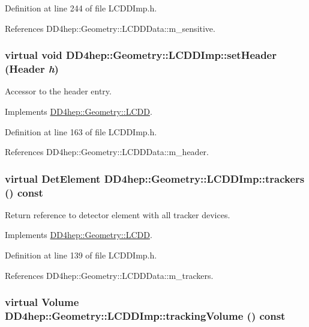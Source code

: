 Definition at line 244 of file LCDDImp.h.

References DD4hep::Geometry::LCDDData::m\_\-sensitive.\hypertarget{class_d_d4hep_1_1_geometry_1_1_l_c_d_d_imp_af37d163b4c62d1ef1602555d39e0eff8}{
\subsubsection[{setHeader}]{\setlength{\rightskip}{0pt plus 5cm}virtual void DD4hep::Geometry::LCDDImp::setHeader ({\bf Header} {\em h})}}
\label{class_d_d4hep_1_1_geometry_1_1_l_c_d_d_imp_af37d163b4c62d1ef1602555d39e0eff8}


Accessor to the header entry. 

Implements \hyperlink{class_d_d4hep_1_1_geometry_1_1_l_c_d_d_a9927ac6aeae1dad18e22413deba9aa65}{DD4hep::Geometry::LCDD}.

Definition at line 163 of file LCDDImp.h.

References DD4hep::Geometry::LCDDData::m\_\-header.\hypertarget{class_d_d4hep_1_1_geometry_1_1_l_c_d_d_imp_a0456a61fe57ba6e772da7668a26e4eb9}{
\subsubsection[{trackers}]{\setlength{\rightskip}{0pt plus 5cm}virtual {\bf DetElement} DD4hep::Geometry::LCDDImp::trackers () const}}
\label{class_d_d4hep_1_1_geometry_1_1_l_c_d_d_imp_a0456a61fe57ba6e772da7668a26e4eb9}


Return reference to detector element with all tracker devices. 

Implements \hyperlink{class_d_d4hep_1_1_geometry_1_1_l_c_d_d_a23b3868f3b09adccc62799612285c7db}{DD4hep::Geometry::LCDD}.

Definition at line 139 of file LCDDImp.h.

References DD4hep::Geometry::LCDDData::m\_\-trackers.\hypertarget{class_d_d4hep_1_1_geometry_1_1_l_c_d_d_imp_afb0ba5d32423a9a36a2d02e5dc8d63ef}{
\subsubsection[{trackingVolume}]{\setlength{\rightskip}{0pt plus 5cm}virtual {\bf Volume} DD4hep::Geometry::LCDDImp::trackingVolume () const}}
\label{class_d_d4hep_1_1_geometry_1_1_l_c_d_d_imp_afb0ba5d32423a9a36a2d02e5dc8d63ef}


